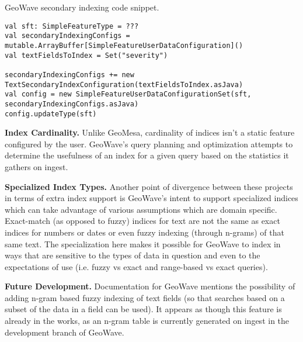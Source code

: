 \begin{algorithm}[htb]
\caption{GeoWave secondary indexing code snippet.}\label{alg:geowave}
{\footnotesize\begin{lstlisting}
val sft: SimpleFeatureType = ???
val secondaryIndexingConfigs = mutable.ArrayBuffer[SimpleFeatureUserDataConfiguration]()
val textFieldsToIndex = Set("severity")

secondaryIndexingConfigs += new TextSecondaryIndexConfiguration(textFieldsToIndex.asJava)
val config = new SimpleFeatureUserDataConfigurationSet(sft, secondaryIndexingConfigs.asJava)
config.updateType(sft)
\end{lstlisting}}
\end{algorithm}

{\bf Index Cardinality.}
Unlike GeoMesa, cardinality of indices isn't a static feature configured by the user.
GeoWave's query planning and optimization attempts to determine the usefulness of an index for a given query based on the statistics it gathers on ingest.

{\bf Specialized Index Types.}
Another point of divergence between these projects in terms of extra index support is GeoWave's intent to support specialized indices which can take advantage of various assumptions which are domain specific.
Exact-match (as opposed to fuzzy) indices for text are not the same as exact indices for numbers or dates or even fuzzy indexing (through n-grams) of that same text.
The specialization here makes it possible for GeoWave to index in ways that are sensitive to the types of data in question and even to the expectations of use (i.e. fuzzy vs exact and range-based vs exact queries).

{\bf Future Development.}
Documentation for GeoWave mentions the possibility of adding n-gram based fuzzy indexing of text fields (so that searches based on a subset of the data in a field can be used).
It appears as though this feature is already in the works, as an n-gram table is currently generated on ingest in the development branch of GeoWave.
